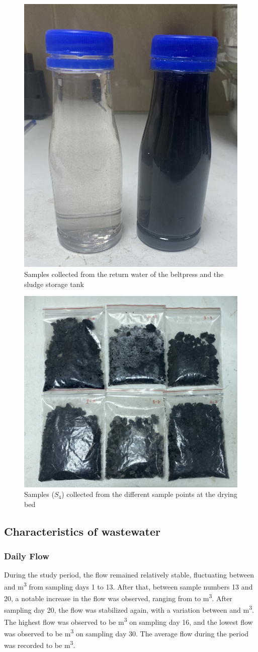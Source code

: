 

\begin{figure}[H]
\centering
\includegraphics[width=0.4\linewidth]{results/Sample storage tank and return water.jpg}
\caption{Samples collected from the return water of the beltpress and the sludge storage tank}
\label{fig:Sample_storagetank_returnwater}
\end{figure}

\begin{figure}[H]
\centering
\includegraphics[width=0.6\linewidth]{results/Sample drying bed.jpg}
\caption{Samples ($S_4$) collected from the different sample points at the drying bed}
\label{fig:Sample_dryingbed}
\end{figure}


\newpage
\subsection{Characteristics of wastewater}

\subsubsection{Daily Flow}
During the study period, the flow remained relatively stable, fluctuating between  and  \unit{m^3} from sampling days 1 to 13. After that, between sample numbers 13 and 20, a notable increase in the flow was observed, ranging from  to  \unit{m^3}. After sampling day 20, the flow was stabilized again, with a variation between  and  \unit{m^3}. The highest flow was observed to be  \unit{m^3} on sampling day 16, and the lowest flow was observed to be  \unit{m^3} on sampling day 30. The average flow during the period was recorded to be  \unit{m^3}.


